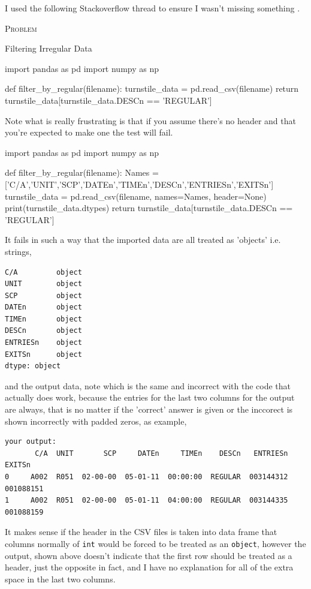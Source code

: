 \documentclass{article}
\numberwithin{questionCtr}{section}
\newcounter{problemCtr}
\newenvironment{problem}{%
   \bigskip\noindent%
   \refstepcounter{problemCtr}%
   \textsc{Problem \theproblemCtr}%
   \newline%
   }{\par\bigskip}  %
\numberwithin{problemCtr}{section}
\begin{document}
I used the following Stackoverflow thread to ensure I wasn't missing something
\cite{Stackoverflow-combining-files}.

\begin{problem}
  Filtering Irregular Data
\end{problem}

\begin{python1}
import pandas as pd
import numpy as np

def filter_by_regular(filename):
    turnstile_data = pd.read_csv(filename)
    return turnstile_data[turnstile_data.DESCn == 'REGULAR']  
\end{python1}

Note what is really frustrating is that if you assume there's no header and that
you're expected to make one the test will fail.

\begin{python1}
import pandas as pd
import numpy as np

def filter_by_regular(filename):
    Names = ['C/A','UNIT','SCP','DATEn','TIMEn','DESCn','ENTRIESn','EXITSn']
    turnstile_data = pd.read_csv(filename, names=Names, header=None)
    print(turnstile_data.dtypes)
    return turnstile_data[turnstile_data.DESCn == 'REGULAR']
\end{python1}

It fails in such a way that the imported data are all treated as 'objects' i.e. strings,

\begin{verbatim}
C/A         object
UNIT        object
SCP         object
DATEn       object
TIMEn       object
DESCn       object
ENTRIESn    object
EXITSn      object
dtype: object
\end{verbatim}
and the output data, note which is the same and incorrect with the code that
actually does work, because the entries for the last two columns for the output
are always, that is no matter if the 'correct' answer is given or the inccorect
is shown incorrectly with padded zeros, as example,

{\footnotesize
\begin{verbatim}
your output:
       C/A  UNIT       SCP     DATEn     TIMEn    DESCn   ENTRIESn                     EXITSn
0     A002  R051  02-00-00  05-01-11  00:00:00  REGULAR  003144312                 001088151
1     A002  R051  02-00-00  05-01-11  04:00:00  REGULAR  003144335               001088159      
\end{verbatim}}
It makes sense if the header in the CSV files is taken into data frame that
columns normally of \verb|int| would be forced to be treated as an
\verb|object|, however the output, shown above doesn't indicate that the first
row should be treated as a header, just the opposite in fact, and I have no
explanation for all of the extra space in the last two columns.
\end{document}
